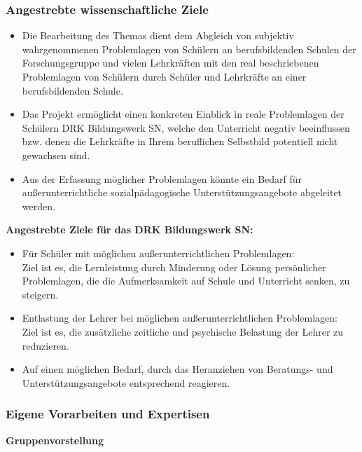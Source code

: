\subsubsection{Angestrebte wissenschaftliche Ziele}
\label{sec:AngestrebteWissenschaftlicheZiele}

\begin{itemize}
	\item Die Bearbeitung des Themas dient dem Abgleich von subjektiv wahrgenommenen Problemlagen von Schülern an berufsbildenden Schulen der Forschungsgruppe und vielen Lehrkräften mit den real beschriebenen Problemlagen von Schülern durch Schüler und Lehrkräfte an einer berufsbildenden Schule.
	\item Das Projekt ermöglicht einen konkreten Einblick in reale Problemlagen der Schülern DRK Bildungswerk SN, welche den Unterricht negativ beeinflussen bzw. denen die Lehrkräfte in Ihrem beruflichen Selbstbild potentiell nicht gewachsen sind.
	\item Aus der Erfassung möglicher Problemlagen könnte ein Bedarf für außerunterrichtliche sozialpädagogische Unterstützungsangebote abgeleitet werden.
\end{itemize}

\textbf{Angestrebte Ziele für das DRK Bildungswerk SN:}
 
\begin{itemize}
	\item Für Schüler mit möglichen außerunterrichtlichen Problemlagen:
	\\
	Ziel ist es, die Lernleistung durch Minderung oder Lösung persönlicher Problemlagen, die die Aufmerksamkeit auf Schule und Unterricht senken, zu steigern.
	\item Entlastung der Lehrer bei möglichen außerunterrichtlichen Problemlagen:
	 \\
	Ziel ist es, die zusätzliche zeitliche und psychische Belastung der Lehrer zu reduzieren. 
	\item Auf einen möglichen Bedarf, durch das Heranziehen von Beratungs- und Unterstützungsangebote entsprechend reagieren.
\end{itemize}

\subsubsection{Eigene Vorarbeiten und Expertisen}
\label{sec:EigeneVorarbeitenUndExpertisen}

\textbf{Gruppenvorstellung}

